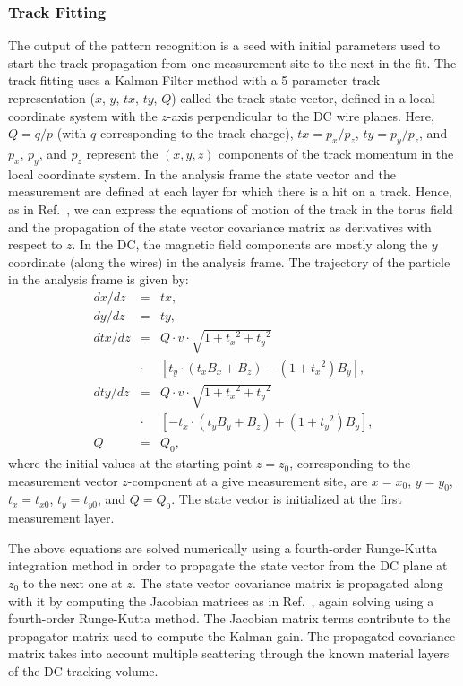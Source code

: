 \subsubsection{Track Fitting}
\label{sec-trackfitting}

The output of the pattern recognition is a seed with initial parameters used to start the track propagation from one
measurement site to the next in the fit. The track fitting uses a Kalman Filter method with a 5-parameter track
representation ($x$, $y$, $tx$, $ty$, $Q$) called the track state vector, defined in a local coordinate system
with the $z$-axis perpendicular to the DC wire planes. Here, $Q=q/p$ (with $q$ corresponding to the track charge),
$tx=p_x/p_z$, $ty=p_y/p_z$, and $p_x$, $p_y$, and $p_z$ represent the $(x,y,z)$ components of the track momentum
in the {\color{red} local coordinate system.} In the analysis frame the state vector and the measurement are defined at each layer for
which there is a hit on a track. Hence, as in Ref.~\cite{spiri}, we can express the equations of motion of the track in the
torus field and the propagation of the state vector covariance matrix as derivatives with respect to $z$. In the DC, the
magnetic field components are mostly along the $y$ coordinate (along the wires) in the analysis frame. The trajectory of
the particle in the analysis frame is given by:
\begin{eqnarray}
dx/dz  &=& tx, \nonumber \\
dy/dz  &=&  ty, \nonumber \\
dtx/dz &=& Q \cdot v \cdot \sqrt{1 + {t_x}^2 + {t_y}^2}  \nonumber \\
       &\cdot&\!\!\!\!\! [t_y\cdot (t_x B_x + B_z) - (1 + {t_x}^2 ) B_y],  \nonumber \\
dty/dz  &=&  Q \cdot v \cdot \sqrt{1 + {t_x}^2 + {t_y}^2} \nonumber \\
      &\cdot&\!\!\!\!\! [-t_x\cdot (t_y B_y + B_z) + (1 + {t_y}^2 ) B_y], \nonumber \\
Q  &=&  Q_0,
\end{eqnarray}
\noindent
where the initial values at the starting point $z = z_0$, corresponding to the measurement vector $z$-component at a
give measurement site,  are $x = x_0$, $y = y_0$, $t_x = t_{x0}$, $t_y = t_{y0}$, and $Q = Q_0$.  The state vector is
initialized at the first measurement layer.

The above equations are solved numerically using a fourth-order Runge-Kutta integration method in order to
propagate the state vector from the DC plane at $z_0$ to the next one at $z$.  The state vector covariance
matrix is propagated along with it by computing the Jacobian matrices as in Ref.~\cite{spiri}, again solving using
a fourth-order Runge-Kutta method. The Jacobian matrix terms contribute to the propagator matrix used to
compute the Kalman gain. The propagated covariance matrix takes into account multiple scattering through the
known material layers of the DC tracking volume.

